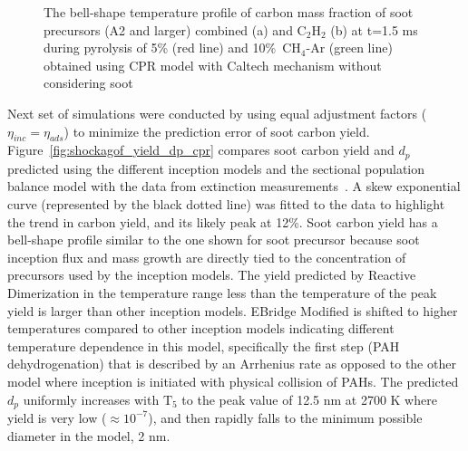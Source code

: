 \begin{figure}[H]
\begin{subfigure}[t]{0.36\textwidth}
	\end{subfigure}
	\caption{The bell-shape temperature profile of carbon mass fraction of soot precursors (A2 and larger) combined (a) and $\mathrm{C_2H_2}$ (b) at t=1.5 ms during pyrolysis of 5\% (red line) and 10\%~$\mathrm{CH_4}$-Ar (green line) obtained using CPR model with Caltech mechanism without considering soot}
	\label{fig:SPC_cmf_cpr} 
\end{figure}

Next set of simulations were conducted by using equal adjustment factors ($\eta_{inc}=\eta_{ads}$) to minimize the prediction error of soot carbon yield. Figure~\ref{fig:shockagof_yield_dp_cpr} compares soot carbon yield and $d_p$ predicted using the different inception models and the sectional population balance model with the data from extinction measurements~\citep{agafonov2016unified}. A skew exponential curve (represented by the black dotted line) was fitted to the data to highlight the trend in carbon yield, and its likely peak at 12\%. Soot carbon yield has a bell-shape profile similar to the one shown for soot precursor because soot inception flux and mass growth are directly tied to the concentration of precursors used by the inception models. The yield predicted by Reactive Dimerization in the temperature range less than the temperature of the peak yield is larger than other inception models. EBridge Modified is shifted to higher temperatures compared to other inception models indicating different temperature dependence in this model, specifically the first step (PAH dehydrogenation) that is described by an Arrhenius rate as opposed to the other model where inception is initiated with physical collision of PAHs. The predicted $d_p$ uniformly increases with $\mathrm{T_5}$ to the peak value of 12.5 nm at 2700 K where yield is very low ($\approx10^{-7}$), and then rapidly falls to the minimum possible diameter in the model, 2 nm.

